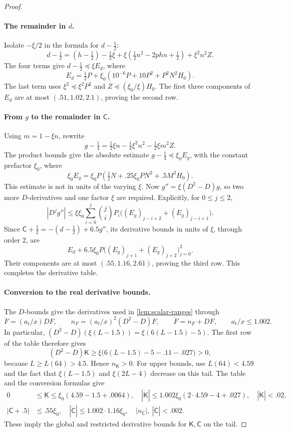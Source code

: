 \begin{proof}
\paragraph{The remainder in $d$.}
Isolate $-\xi/2$ in the formula for $d-\tfrac12$:
\[
 d-\tfrac12
 =(h-\tfrac12)-\tfrac12\xi+
    \xi(\tfrac12n^2-2phn+\tfrac12)+\xi^2n^2Z.
\]
The four terms give $d-\tfrac12\preccurlyeq\xi E_d$, where
\[
 E_d=\tfrac12P+
       \xi_0(10^{-6}P+10P^2+P^2N^2H_0).
\]
The last term uses $\xi^2\preccurlyeq\xi^2P^2$ and $Z\preccurlyeq(\xi_0/\xi)H_0$. The first three components of $E_d$ are at most $(.51,1.02,2.1)$, proving the second row.

\paragraph{From $g$ to the remainder in $\mathsf C$.}
Using $m=1-\xi n$, rewrite
\[
 g-\tfrac14=\tfrac12\xi n-\tfrac14\xi^2n^2-\tfrac12\xi m^2Z.
\]
The product bounds give the absolute estimate $g-\tfrac14\preccurlyeq\xi_0E_g$, with the constant prefactor $\xi_0$, where
\[
 \xi_0E_g
 =\xi_0P(\tfrac12N+.25\xi_0PN^2+.5M^2H_0).
\]
This estimate is not in units of the varying $\xi$. Now $g''=\xi(D^2-D)g$, so two more $D$-derivatives and one factor $\xi$ are required. Explicitly, for $0\le j\le2$,
\[
 |D^jg''|
 \le \xi\xi_0\sum_{i=0}^j\binom ji P_i
       \big((E_g)_{j-i+2}+(E_g)_{j-i+1}\big).
\]
Since $\mathsf C+\tfrac12=-(d-\tfrac12)+6.5g''$, its derivative bounds in units of $\xi$, through order 2, are
\[
 E_d+6.5\xi_0P
       \big((E_g)_{j+1}+(E_g)_{j+2}\big)_{j=0}^2.
\]
Their components are at most $(.55,1.16,2.61)$, proving the third row. This completes the derivative table.

\paragraph{Conversion to the real derivative bounds.}
The $D$-bounds give the derivatives used in \cref{lem:scalar-ranges} through
\[
 \dot F=(a_t/x)DF,\qquad
 n_F=(a_t/x)^2(D^2-D)F,\qquad
 \ddot F=n_F+DF,\qquad a_t/x\le1.002.
\]
In particular, $(D^2-D)(\xi(L-1.5))=\xi(6(L-1.5)-5)$. The first row of the table therefore gives
\[
 (D^2-D)\mathsf K
 \ge\xi\big(6(L-1.5)-5-.11-.027\big)>0,
\]
because $L\ge L(64)>4.5$. Hence $n_{\mathsf K}>0$. For upper bounds, use $L(64)<4.59$ and the fact that $\xi(L-1.5)$ and $\xi(2L-4)$ decrease on this tail. The table and the conversion formulas give
\[
\begin{aligned}
 0&\le\mathsf K\le\xi_0(4.59-1.5+.0064),\quad
 |\dot{\mathsf K}|\le1.002\xi_0(2\cdot4.59-4+.027),\quad
 |\ddot{\mathsf K}|<.02,\\
 |\mathsf C+.5|&\le .55\xi_0,\quad |\dot{\mathsf C}|\le1.002\cdot1.16\xi_0,\quad
 |n_{\mathsf C}|,\ |\ddot{\mathsf C}|<.002.
\end{aligned}
\]
These imply the global and restricted derivative bounds for $\mathsf K,\mathsf C$ on the tail.


\end{proof}
